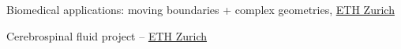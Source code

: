 \begin{frame}[label=app-14]{Biomedical applications: moving boundaries + complex geometries, \href{https://www.dropbox.com/s/p1xnc7mefoqboti/aorta_rigid.mp4?dl=0}{ETH Zurich}}
\end{frame}

\begin{frame}[label=app-15]{Cerebrospinal fluid project -- \href{https://idsc.ethz.ch/research-guzzella-onder/research-projects/ProjectArchive/csf-biothermofluidics.html}{ETH Zurich}}
\end{frame}
    
    
    
